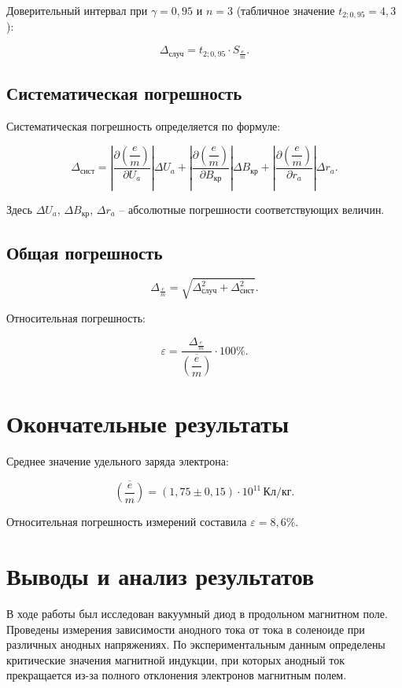 \documentclass[14pt]{extarticle}
\begin{document}
Доверительный интервал при $\gamma = 0{,}95$ и $n=3$ (табличное значение $t_{2;0{,}95} = 4{,}3$):


$$ \Delta_{\text{случ}} = t_{2;0{,}95} \cdot S_{\frac{e}{m}}. $$


\subsection{Систематическая погрешность}

Систематическая погрешность определяется по формуле:


$$ \Delta_{\text{сист}} = \left| \dfrac{\partial \left( \dfrac{e}{m} \right)}{\partial U_a} \right| \Delta U_a + \left| \dfrac{\partial \left( \dfrac{e}{m} \right)}{\partial B_{\text{кр}}} \right| \Delta B_{\text{кр}} + \left| \dfrac{\partial \left( \dfrac{e}{m} \right)}{\partial r_a} \right| \Delta r_a. $$


Здесь $\Delta U_a$, $\Delta B_{\text{кр}}$, $\Delta r_a$ -- абсолютные погрешности соответствующих величин.

\subsection{Общая погрешность}


$$ \Delta_{\frac{e}{m}} = \sqrt{\Delta_{\text{случ}}^2 + \Delta_{\text{сист}}^2}. $$


Относительная погрешность:


$$ \varepsilon = \dfrac{\Delta_{\frac{e}{m}}}{\overline{\left( \dfrac{e}{m} \right)}} \cdot 100\%. $$


\section{Окончательные результаты}

Среднее значение удельного заряда электрона:


$$ \overline{\left( \dfrac{e}{m} \right)} = (1{,}75 \pm 0{,}15) \cdot 10^{11}\,\text{Кл/кг}. $$


Относительная погрешность измерений составила $\varepsilon = 8{,}6\%$.

\section{Выводы и анализ результатов}

В ходе работы был исследован вакуумный диод в продольном магнитном поле. Проведены измерения зависимости анодного тока от тока в соленоиде при различных анодных напряжениях. По экспериментальным данным определены критические значения магнитной индукции, при которых анодный ток прекращается из-за полного отклонения электронов магнитным полем.
\end{document}
